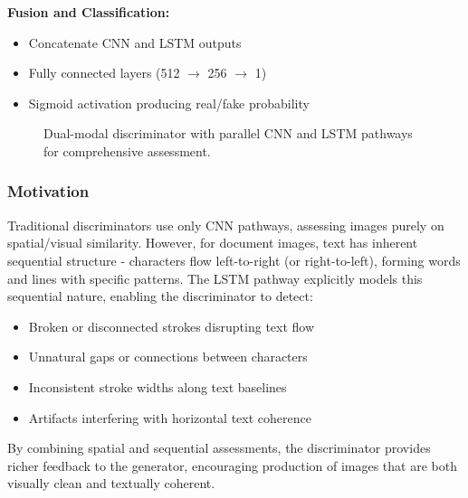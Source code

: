 \documentclass[journal]{IEEEtran}
\begin{document}
\textbf{Fusion and Classification:}
\begin{itemize}
    \item Concatenate CNN and LSTM outputs
    \item Fully connected layers (512 $\rightarrow$ 256 $\rightarrow$ 1)
    \item Sigmoid activation producing real/fake probability
\end{itemize}

\begin{figure}[!t]
\centering
\caption{Dual-modal discriminator with parallel CNN and LSTM pathways for comprehensive assessment.}
\label{fig:discriminator_arch}
\end{figure}

\subsubsection{Motivation}

Traditional discriminators use only CNN pathways, assessing images purely on spatial/visual similarity. However, for document images, text has inherent sequential structure - characters flow left-to-right (or right-to-left), forming words and lines with specific patterns. The LSTM pathway explicitly models this sequential nature, enabling the discriminator to detect:
\begin{itemize}
    \item Broken or disconnected strokes disrupting text flow
    \item Unnatural gaps or connections between characters
    \item Inconsistent stroke widths along text baselines
    \item Artifacts interfering with horizontal text coherence
\end{itemize}

By combining spatial and sequential assessments, the discriminator provides richer feedback to the generator, encouraging production of images that are both visually clean and textually coherent.
\end{document}
